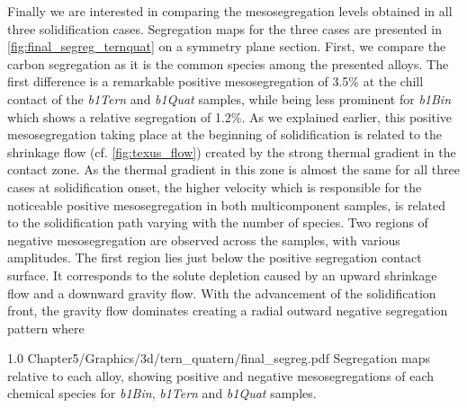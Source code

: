 Finally we are interested in comparing the mesosegregation levels obtained in all three solidification cases. Segregation maps for the three cases
are presented in \cref{fig:final_segreg_ternquat} on a symmetry plane section. First, we compare the carbon segregation as it is the common species among the presented alloys.
The first difference is a remarkable positive mesosegregation of 3.5\% at the chill contact of the  \emph{b1Tern} and \emph{b1Quat} samples, 
while being less prominent for \emph{b1Bin} which shows a relative segregation of 1.2\%. As we explained earlier, this positive mesosegregation taking place at the beginning
of solidification is related to the shrinkage flow (cf. \cref{fig:texus_flow}) created by the strong thermal gradient in the contact zone. 
As the thermal gradient in this zone is almost the same
for all three cases at solidification onset, the higher velocity which is responsible for the noticeable positive mesosegregation in both multicomponent samples,
is related to the solidification path varying with the number of species.
Two regions of negative mesosegregation are observed across the samples, with various amplitudes. The first region lies just below the positive segregation contact surface.
It corresponds to the solute depletion caused by an upward shrinkage flow and a downward gravity flow. With the advancement of the solidification front,
the gravity flow dominates creating a radial outward negative segregation pattern where  


\begin{figureth}
{1.0}
{Chapter5/Graphics/3d/tern_quatern/final_segreg.pdf}
{Segregation maps relative to each alloy, showing positive and negative mesosegregations 
of each chemical species for \emph{b1Bin}, \emph{b1Tern} and \emph{b1Quat} samples.}
\label{fig:final_segreg_ternquat}
\end{figureth}



